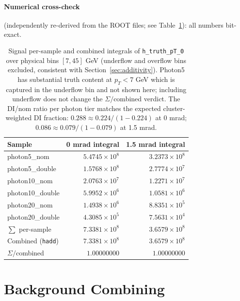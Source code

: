 \documentclass[11pt,a4paper]{article}
\begin{document}
\paragraph{Numerical cross-check} (independently re-derived from the ROOT files; see Table~\ref{tab:signal_integrals}): all numbers bit-exact.

\begin{table}[H]
\centering
\begin{tabular}{lrr}
\toprule
Sample                     & 0 mrad integral      & 1.5 mrad integral   \\
\midrule
photon5\_nom               & $5.4745\times10^{8}$ & $3.2373\times10^{8}$ \\
photon5\_double            & $1.5768\times10^{8}$ & $2.7774\times10^{7}$ \\
photon10\_nom              & $2.0763\times10^{7}$ & $1.2271\times10^{7}$ \\
photon10\_double           & $5.9952\times10^{6}$ & $1.0581\times10^{6}$ \\
photon20\_nom              & $1.4938\times10^{6}$ & $8.8351\times10^{5}$ \\
photon20\_double           & $4.3085\times10^{5}$ & $7.5631\times10^{4}$ \\
\midrule
$\sum$ per-sample          & $7.3381\times10^{8}$ & $3.6579\times10^{8}$ \\
Combined (\texttt{hadd})   & $7.3381\times10^{8}$ & $3.6579\times10^{8}$ \\
$\Sigma/$combined          & $1.00000000$          & $1.00000000$          \\
\bottomrule
\end{tabular}
\caption{Signal per-sample and combined integrals of \texttt{h\_truth\_pT\_0} over physical bins $[7, 45]$ GeV (underflow and overflow bins excluded, consistent with Section~\ref{sec:additivity}). Photon5 has substantial truth content at $p_T < 7$ GeV which is captured in the underflow bin and not shown here; including underflow does not change the $\Sigma/$combined verdict. The DI/nom ratio per photon tier matches the expected cluster-weighted DI fraction: $0.288 \approx 0.224/(1-0.224)$ at 0 mrad; $0.086 \approx 0.079/(1-0.079)$ at 1.5 mrad.}
\label{tab:signal_integrals}
\end{table}

\section{Background Combining}
\end{document}
